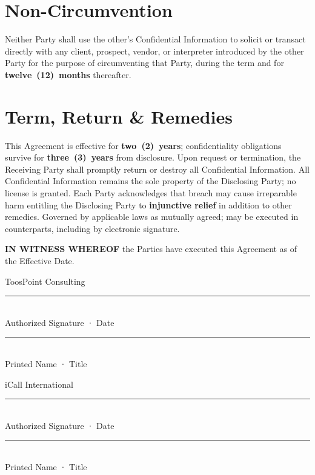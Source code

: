 \documentclass{toospoint}
\begin{document}
\section{Non-Circumvention}
\noindent Neither Party shall use the other's Confidential Information to solicit or
transact directly with any client, prospect, vendor, or interpreter introduced by
the other Party for the purpose of circumventing that Party, during the term and
for \textbf{twelve~(12)~months} thereafter.

\section{Term, Return \& Remedies}
\noindent This Agreement is effective for \textbf{two~(2)~years}; confidentiality
obligations survive for \textbf{three~(3)~years} from disclosure. Upon request or
termination, the Receiving Party shall promptly return or destroy all Confidential
Information. All Confidential Information remains the sole property of the
Disclosing Party; no license is granted. Each Party acknowledges that breach may
cause irreparable harm entitling the Disclosing Party to \textbf{injunctive
relief} in addition to other remedies. Governed by applicable laws as mutually
agreed; may be executed in counterparts, including by electronic signature.

\normalsize

\vspace{8pt}

\begin{center}
  {\sffamily\footnotesize\bfseries\color{TPDark}IN WITNESS WHEREOF}\enspace%
  {\sffamily\scriptsize\color{TPGray}the Parties have executed this Agreement as of the Effective Date.}
\end{center}

\vspace{4pt}

\noindent
\begin{minipage}[t]{0.46\textwidth}
  \sffamily\footnotesize
  {\color{TPGray}ToosPoint Consulting}\\[22pt]
  {\color{TPDark}\rule{\linewidth}{0.6pt}}\\[1pt]
  {\color{TPGray}Authorized Signature \; · \; Date}\\[14pt]
  {\color{TPBorder}\rule{\linewidth}{0.6pt}}\\[1pt]
  {\color{TPGray}Printed Name \; · \; Title}
\end{minipage}%
\hfill
\begin{minipage}[t]{0.46\textwidth}
  \sffamily\footnotesize
  {\color{TPGray}iCall International}\\[22pt]
  {\color{TPDark}\rule{\linewidth}{0.6pt}}\\[1pt]
  {\color{TPGray}Authorized Signature \; · \; Date}\\[14pt]
  {\color{TPBorder}\rule{\linewidth}{0.6pt}}\\[1pt]
  {\color{TPGray}Printed Name \; · \; Title}
\end{minipage}
\end{document}
